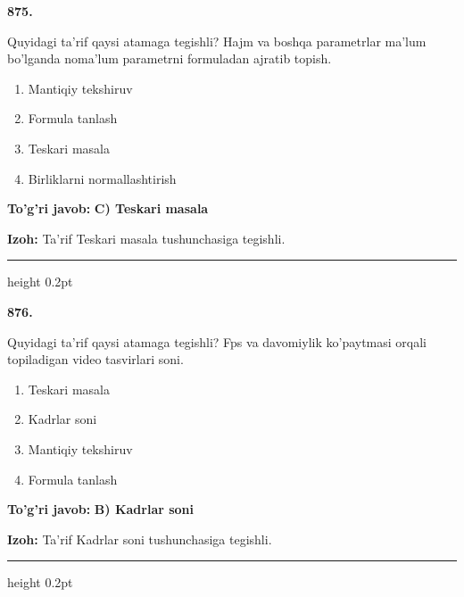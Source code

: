 \documentclass[10pt,a4paper,oneside]{article}
\begin{document}
\noindent\textbf{\color{ink}875.}
\par
Quyidagi ta'rif qaysi atamaga tegishli? Hajm va boshqa parametrlar ma'lum bo'lganda noma'lum parametrni formuladan ajratib topish.
\begin{enumerate}[label=\Alph*),leftmargin=9mm]
\item Mantiqiy tekshiruv
\item Formula tanlash
\item Teskari masala
\item Birliklarni normallashtirish
\end{enumerate}
\begin{tcolorbox}[enhanced,breakable,colback=teal!4,colframe=teal!50!black,boxrule=0.5pt,arc=1.1mm,left=3mm,right=3mm,top=1.7mm,bottom=1.7mm,before skip=2mm,after skip=2mm]
\textbf{\color{teal}To'g'ri javob:} \textbf{C) Teskari masala}
\par\smallskip
\textbf{Izoh:} Ta'rif Teskari masala tushunchasiga tegishli.
\end{tcolorbox}
\vspace{2mm}\hrule height 0.2pt \vspace{3mm}

\noindent\textbf{\color{ink}876.}
\par
Quyidagi ta'rif qaysi atamaga tegishli? Fps va davomiylik ko'paytmasi orqali topiladigan video tasvirlari soni.
\begin{enumerate}[label=\Alph*),leftmargin=9mm]
\item Teskari masala
\item Kadrlar soni
\item Mantiqiy tekshiruv
\item Formula tanlash
\end{enumerate}
\begin{tcolorbox}[enhanced,breakable,colback=teal!4,colframe=teal!50!black,boxrule=0.5pt,arc=1.1mm,left=3mm,right=3mm,top=1.7mm,bottom=1.7mm,before skip=2mm,after skip=2mm]
\textbf{\color{teal}To'g'ri javob:} \textbf{B) Kadrlar soni}
\par\smallskip
\textbf{Izoh:} Ta'rif Kadrlar soni tushunchasiga tegishli.
\end{tcolorbox}
\vspace{2mm}\hrule height 0.2pt \vspace{3mm}
\end{document}
